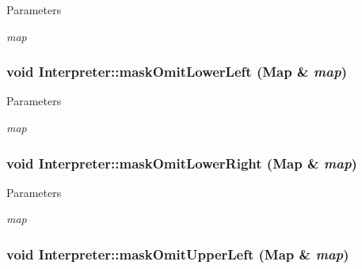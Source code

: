 \begin{DoxyParams}{Parameters}
\item[{\em map}]\end{DoxyParams}
\hypertarget{classInterpreter_a849719043f4eef44634a9b5eb3e3561e}{
\subsubsection[{maskOmitLowerLeft}]{\setlength{\rightskip}{0pt plus 5cm}void Interpreter::maskOmitLowerLeft ({\bf Map} \& {\em map})}}
\label{classInterpreter_a849719043f4eef44634a9b5eb3e3561e}

\begin{DoxyParams}{Parameters}
\item[{\em map}]\end{DoxyParams}
\hypertarget{classInterpreter_a5aab0968d1a9c62fd20e1f11446deb73}{
\subsubsection[{maskOmitLowerRight}]{\setlength{\rightskip}{0pt plus 5cm}void Interpreter::maskOmitLowerRight ({\bf Map} \& {\em map})}}
\label{classInterpreter_a5aab0968d1a9c62fd20e1f11446deb73}

\begin{DoxyParams}{Parameters}
\item[{\em map}]\end{DoxyParams}
\hypertarget{classInterpreter_a6232cdb6a8637bac127df9d19e8fd705}{
\subsubsection[{maskOmitUpperLeft}]{\setlength{\rightskip}{0pt plus 5cm}void Interpreter::maskOmitUpperLeft ({\bf Map} \& {\em map})}}
\label{classInterpreter_a6232cdb6a8637bac127df9d19e8fd705}

